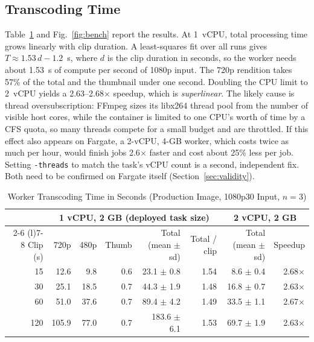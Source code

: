 \documentclass[conference]{IEEEtran}
\begin{document}
\subsection{Transcoding Time}
Table~\ref{tab:bench} and Fig.~\ref{fig:bench} report the results. At 1~vCPU, total processing time grows linearly with clip duration. A least-squares fit over all runs gives $T \approx 1.53\,d - 1.2$~s, where $d$ is the clip duration in seconds, so the worker needs about 1.53~s of compute per second of 1080p input. The 720p rendition takes 57\% of the total and the thumbnail under one second. Doubling the CPU limit to 2~vCPU yields a 2.63--2.68$\times$ speedup, which is \emph{superlinear}. The likely cause is thread oversubscription: FFmpeg sizes its libx264 thread pool from the number of visible host cores, while the container is limited to one CPU's worth of time by a CFS quota, so many threads compete for a small budget and are throttled. If this effect also appears on Fargate, a 2-vCPU, 4-GB worker, which costs twice as much per hour, would finish jobs 2.6$\times$ faster and cost about 25\% less per job. Setting \texttt{-threads} to match the task's vCPU count is a second, independent fix. Both need to be confirmed on Fargate itself (Section~\ref{sec:validity}).

\begin{table}[t]
\caption{Worker Transcoding Time in Seconds (Production Image, 1080p30 Input, $n=3$)}
\label{tab:bench}
\centering
\begin{tabular}{@{}rrrrrrrr@{}}
\toprule
& \multicolumn{5}{c}{1 vCPU, 2 GB (deployed task size)} & \multicolumn{2}{c}{2 vCPU, 2 GB} \\
\cmidrule(lr){2-6} \cmidrule(l){7-8}
Clip (s) & 720p & 480p & Thumb & Total (mean $\pm$ sd) & Total / clip & Total (mean $\pm$ sd) & Speedup \\
\midrule
15 & 12.6 & 9.8 & 0.6 & 23.1 $\pm$ 0.8 & 1.54 & 8.6 $\pm$ 0.4 & 2.68$\times$ \\
30 & 25.1 & 18.5 & 0.7 & 44.3 $\pm$ 1.9 & 1.48 & 16.8 $\pm$ 0.7 & 2.63$\times$ \\
60 & 51.0 & 37.6 & 0.7 & 89.4 $\pm$ 4.2 & 1.49 & 33.5 $\pm$ 1.1 & 2.67$\times$ \\
120 & 105.9 & 77.0 & 0.7 & 183.6 $\pm$ 6.1 & 1.53 & 69.7 $\pm$ 1.9 & 2.63$\times$ \\
\bottomrule
\end{tabular}
\end{table}
\end{document}
